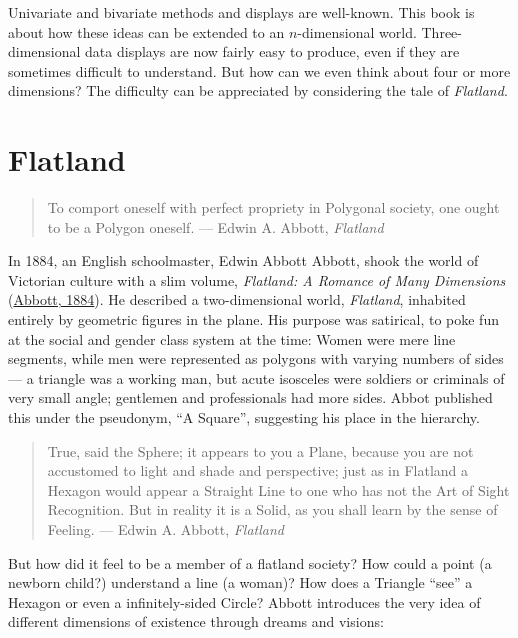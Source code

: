 \documentclass[
  letterpaper,
  10pt,
  krantz2]{krantz}
\begin{document}
Univariate and bivariate methods and displays are well-known. This book
is about how these ideas can be extended to an \(n\)-dimensional world.
Three-dimensional data displays are now fairly easy to produce, even if
they are sometimes difficult to understand. But how can we even think
about four or more dimensions? The difficulty can be appreciated by
considering the tale of \emph{Flatland}.

\hypertarget{flatland}{%
\section*{Flatland}\label{flatland}}


\begin{quote}
To comport oneself with perfect propriety in Polygonal society, one
ought to be a Polygon oneself. --- Edwin A. Abbott, \emph{Flatland}
\end{quote}

In 1884, an English schoolmaster, Edwin Abbott Abbott, shook the world
of Victorian culture with a slim volume, \emph{Flatland: A Romance of
Many Dimensions} (\protect\hyperlink{ref-Abbott:1884}{Abbott, 1884}). He
described a two-dimensional world, \emph{Flatland}, inhabited entirely
by geometric figures in the plane. His purpose was satirical, to poke
fun at the social and gender class system at the time: Women were mere
line segments, while men were represented as polygons with varying
numbers of sides--- a triangle was a working man, but acute isosceles
were soldiers or criminals of very small angle; gentlemen and
professionals had more sides. Abbot published this under the pseudonym,
``A Square'', suggesting his place in the hierarchy.

\begin{quote}
True, said the Sphere; it appears to you a Plane, because you are not
accustomed to light and shade and perspective; just as in Flatland a
Hexagon would appear a Straight Line to one who has not the Art of Sight
Recognition. But in reality it is a Solid, as you shall learn by the
sense of Feeling. --- Edwin A. Abbott, \emph{Flatland}
\end{quote}

But how did it feel to be a member of a flatland society? How could a
point (a newborn child?) understand a line (a woman)? How does a
Triangle ``see'' a Hexagon or even a infinitely-sided Circle? Abbott
introduces the very idea of different dimensions of existence through
dreams and visions:
\end{document}
